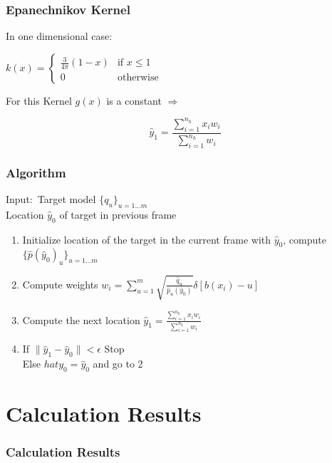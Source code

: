 \documentclass[hyperref={pdfpagelabels=false}]{beamer}
\begin{document}
\begin{frame}
\frametitle{Epanechnikov Kernel}
In one dimensional case:

\vspace{10pt}
$k(x) = \begin{cases} \frac{3}{4\pi}(1-x) &\mbox{if } x \le 1 \\ 
 0 & \mbox{otherwise } \end{cases}$

\vspace{10pt}
For this Kernel $g(x)$ is a constant $\Rightarrow$  

$$\hat{y}_1 = \frac{\sum_{i=1}^{n_h}x_iw_i}{\sum_{i=1}^{n_h}w_i}$$


\end{frame}


\begin{frame}
\frametitle{Algorithm}
Input:\ Target model $\{q_u\}_{u=1\dots m}$\\
	\hspace{30pt} Location $\hat{y}_0$ of target in previous frame
\begin{enumerate}
\item Initialize location of the target in the current frame with $\hat{y}_0$, compute $\{\hat{p}(\hat{y}_0)_u\}_{u=1\dots m}$
\item Compute weights $w_i = \sum_{u=1}^{m}\sqrt{\frac{\hat{q}_u}{\hat{p}_u(\hat{y}_0)}}\delta[b(x_i)-u]$
\item Compute the next location $\hat{y}_1 = \frac{\sum_{i=1}^{n_h}x_iw_i}{\sum_{i=1}^{n_h}w_i}$
\item If $\lVert\hat{y}_1-\hat{y}_0\rVert < \epsilon$ Stop\\
Else $hat{y}_0=\hat{y}_0$ and go to 2
\end{enumerate}


\end{frame}

\section{Calculation Results}
\begin{frame}
\frametitle{Calculation Results}
\centering

\end{frame}
\end{document}
